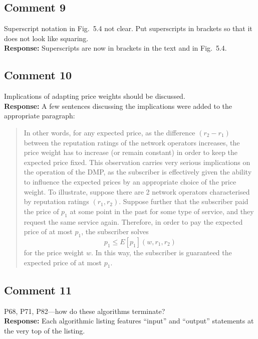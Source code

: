 \documentclass[10pt,a4paper,notitlepage]{article}
\numberwithin{equation}{section}
\begin{document}
\subsection{Comment 9}
Superscript notation in Fig.~5.4 not clear. Put superscripts in brackets so that it does not look like squaring.\\[-2ex]

\textbf{Response:}
Superscripts are now in brackets in the text and in Fig.~5.4.

\subsection{Comment 10}
Implications of adapting price weights should be discussed.\\[-2ex]

\textbf{Response:}
A few sentences discussing the implications were added to the appropriate paragraph:
\begin{quote}
In other words, for any expected price, as the difference $(r_2-r_1)$ between the reputation ratings of the network operators increases, the price weight has to increase (or remain constant) in order to keep the expected price fixed. This observation carries very serious implications on the operation of the DMP, as the subscriber is effectively given the ability to influence the expected prices by an appropriate choice of the price weight. To illustrate, suppose there are 2 network operators characterised by reputation ratings $(r_1, r_2)$. Suppose further that the subscriber paid the price of $p_1$ at some point in the past for some type of service, and they request the same service again. Therefore, in order to pay the expected price of at most $p_1$, the subscriber solves
\begin{equation}
p_1 \le E[p_1](w, r_1, r_2)
\end{equation}
for the price weight $w$. In this way, the subscriber is guaranteed the expected price of at most $p_1$.
\end{quote}

\subsection{Comment 11}
P68, P71, P82---how do these algorithms terminate?\\[-2ex]

\textbf{Response:}
Each algorithmic listing features ``input'' and ``output'' statements at the very top of the listing.
\end{document}

